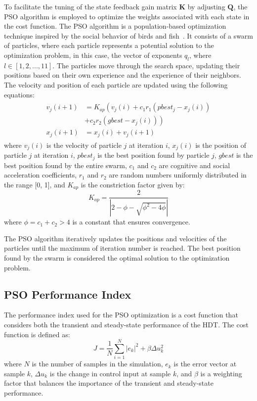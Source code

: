 To facilitate the tuning of the state feedback gain matrix $\mathbf{K}$ by adjusting $\mathbf{Q}$, the PSO algorithm is employed to optimize the weights associated with each state in the cost function. The PSO algorithm is a population-based optimization technique inspired by the social behavior of birds and fish~\cite{clercSwarmQueenDeterministic1999}. It consists of a swarm of particles, where each particle represents a potential solution to the optimization problem, in this case, the vector of exponents $q_l$, where $l\in\left[1,2,...,11\right]$. The particles move through the search space, updating their positions based on their own experience and the experience of their neighbors. The velocity and position of each particle are updated using the following equations:
\begin{align}
    \begin{aligned}
        v_j(i + 1) &= K_{ap}\left(v_j(i) + c_1 r_1 (pbest_j - x_j(i)) \right.\\
        & \left. + c_2 r_2 (gbest - x_j(i))\right)\\
        x_j(i + 1) &= x_j(i) + v_j(i + 1)
    \end{aligned}
\end{align}
where $v_j(i)$ is the velocity of particle $j$ at iteration $i$, $x_j(i)$ is the position of particle $j$ at iteration $i$, $pbest_j$ is the best position found by particle $j$, $gbest$ is the best position found by the entire swarm, $c_1$ and $c_2$ are cognitive and social acceleration coefficients, $r_1$ and $r_2$ are random numbers uniformly distributed in the range [0, 1], and $K_{ap}$ is the constriction factor given by:
\begin{equation}
    K_{ap} = \dfrac{2}{\left|2 - \phi - \sqrt{\phi^2 - 4\phi}\right|}
\end{equation}
where $\phi = c_1 + c_2 > 4$ is a constant that ensures convergence.

The PSO algorithm iteratively updates the positions and velocities of the particles until the maximum of iteration number is reached. The best position found by the swarm is considered the optimal solution to the optimization problem.

\subsection{PSO Performance Index}

The performance index used for the PSO optimization is a cost function that considers both the transient and steady-state performance of the HDT. The cost function is defined as:
\begin{equation}
    J = \dfrac{1}{N} \sum_{i=1}^{N} |e_k|^2 + \beta \Delta u_k^2
\end{equation}
where $N$ is the number of samples in the simulation, $e_k$ is the error vector at sample $k$, $\Delta u_k$ is the change in control input at sample $k$, and $\beta$ is a weighting factor that balances the importance of the transient and steady-state performance.

